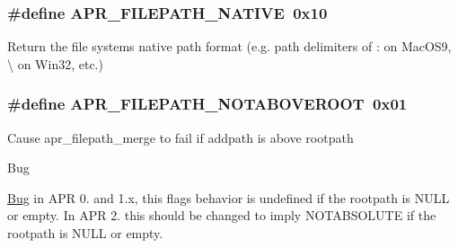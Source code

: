 \subsubsection[{\texorpdfstring{A\+P\+R\+\_\+\+F\+I\+L\+E\+P\+A\+T\+H\+\_\+\+N\+A\+T\+I\+VE}{APR_FILEPATH_NATIVE}}]{\setlength{\rightskip}{0pt plus 5cm}\#define A\+P\+R\+\_\+\+F\+I\+L\+E\+P\+A\+T\+H\+\_\+\+N\+A\+T\+I\+VE~0x10}\hypertarget{group__apr__filepath_ga2d72ade2cada76d2fa8af3fe4d8fb1de}{}\label{group__apr__filepath_ga2d72ade2cada76d2fa8af3fe4d8fb1de}
Return the file system\textquotesingle{}s native path format (e.\+g. path delimiters of \textquotesingle{}\+:\textquotesingle{} on Mac\+O\+S9, \textquotesingle{}\textbackslash{}\textquotesingle{} on Win32, etc.) 
\subsubsection[{\texorpdfstring{A\+P\+R\+\_\+\+F\+I\+L\+E\+P\+A\+T\+H\+\_\+\+N\+O\+T\+A\+B\+O\+V\+E\+R\+O\+OT}{APR_FILEPATH_NOTABOVEROOT}}]{\setlength{\rightskip}{0pt plus 5cm}\#define A\+P\+R\+\_\+\+F\+I\+L\+E\+P\+A\+T\+H\+\_\+\+N\+O\+T\+A\+B\+O\+V\+E\+R\+O\+OT~0x01}\hypertarget{group__apr__filepath_gabb57ce7b23caf512d7f64b92a662ab3d}{}\label{group__apr__filepath_gabb57ce7b23caf512d7f64b92a662ab3d}
Cause apr\+\_\+filepath\+\_\+merge to fail if addpath is above rootpath \begin{DoxyRefDesc}{Bug}
\item[\hyperlink{bug__bug000011}{Bug}]in A\+PR 0. and 1.\+x, this flag\textquotesingle{}s behavior is undefined if the rootpath is N\+U\+LL or empty. In A\+PR 2. this should be changed to imply N\+O\+T\+A\+B\+S\+O\+L\+U\+TE if the rootpath is N\+U\+LL or empty. \end{DoxyRefDesc}
